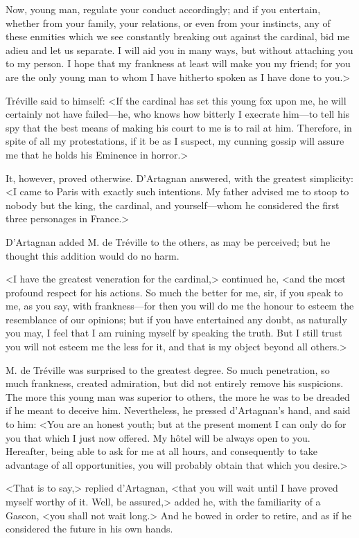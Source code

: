 Now, young man, regulate your conduct accordingly; and if you entertain, whether from your family, your relations, or even from your instincts, any of these enmities which we see constantly breaking out against the cardinal, bid me adieu and let us separate. I will aid you in many ways, but without attaching you to my person. I hope that my frankness at least will make you my friend; for you are the only young man to whom I have hitherto spoken as I have done to you.> 

Tréville said to himself: <If the cardinal has set this young fox upon me, he will certainly not have failed---he, who knows how bitterly I execrate him---to tell his spy that the best means of making his court to me is to rail at him. Therefore, in spite of all my protestations, if it be as I suspect, my cunning gossip will assure me that he holds his Eminence in horror.> 

It, however, proved otherwise. D'Artagnan answered, with the greatest simplicity: <I came to Paris with exactly such intentions. My father advised me to stoop to nobody but the king, the cardinal, and yourself---whom he considered the first three personages in France.> 

D'Artagnan added M. de Tréville to the others, as may be perceived; but he thought this addition would do no harm. 

<I have the greatest veneration for the cardinal,> continued he, <and the most profound respect for his actions. So much the better for me, sir, if you speak to me, as you say, with frankness---for then you will do me the honour to esteem the resemblance of our opinions; but if you have entertained any doubt, as naturally you may, I feel that I am ruining myself by speaking the truth. But I still trust you will not esteem me the less for it, and that is my object beyond all others.> 

M. de Tréville was surprised to the greatest degree. So much penetration, so much frankness, created admiration, but did not entirely remove his suspicions. The more this young man was superior to others, the more he was to be dreaded if he meant to deceive him. Nevertheless, he pressed d'Artagnan's hand, and said to him: <You are an honest youth; but at the present moment I can only do for you that which I just now offered. My hôtel will be always open to you. Hereafter, being able to ask for me at all hours, and consequently to take advantage of all opportunities, you will probably obtain that which you desire.> 

<That is to say,> replied d'Artagnan, <that you will wait until I have proved myself worthy of it. Well, be assured,> added he, with the familiarity of a Gascon, <you shall not wait long.> And he bowed in order to retire, and as if he considered the future in his own hands. 


